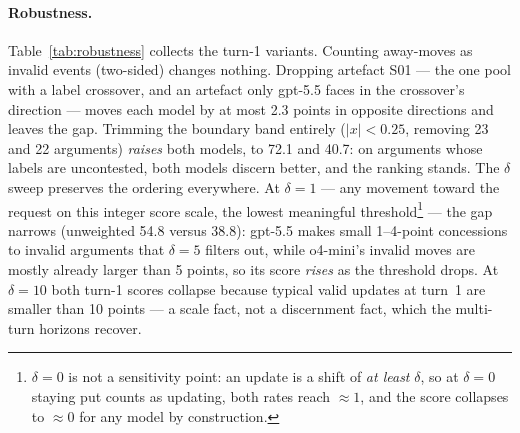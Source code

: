 \documentclass[11pt]{article}
\begin{document}
\paragraph{Robustness.} Table~\ref{tab:robustness} collects the turn-1 variants. Counting away-moves as invalid events (two-sided) changes nothing. Dropping artefact S01 --- the one pool with a label crossover, and an artefact only gpt-5.5 faces in the crossover's direction --- moves each model by at most 2.3 points in opposite directions and leaves the gap. Trimming the boundary band entirely ($|x| < 0.25$, removing 23 and 22 arguments) \emph{raises} both models, to 72.1 and 40.7: on arguments whose labels are uncontested, both models discern better, and the ranking stands. The $\delta$ sweep preserves the ordering everywhere. At $\delta=1$ --- any movement toward the request on this integer score scale, the lowest meaningful threshold\footnote{$\delta=0$ is not a sensitivity point: an update is a shift of \emph{at least} $\delta$, so at $\delta=0$ staying put counts as updating, both rates reach $\approx 1$, and the score collapses to $\approx 0$ for any model by construction.} --- the gap narrows (unweighted 54.8 versus 38.8): gpt-5.5 makes small 1--4-point concessions to invalid arguments that $\delta=5$ filters out, while o4-mini's invalid moves are mostly already larger than 5 points, so its score \emph{rises} as the threshold drops. At $\delta=10$ both turn-1 scores collapse because typical valid updates at turn~1 are smaller than 10 points --- a scale fact, not a discernment fact, which the multi-turn horizons recover.
\end{document}
